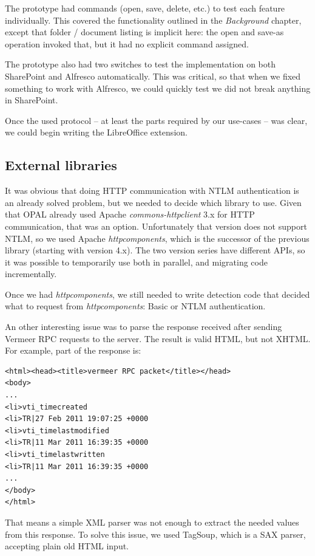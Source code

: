 The prototype had commands (open, save, delete, etc.) to test each feature
individually.  This covered the functionality outlined in the \emph{Background}
chapter, except that folder / document listing is implicit here: the open and
save-as operation invoked that, but it had no explicit command assigned.

The prototype also had two switches to test the implementation on both
SharePoint and Alfresco automatically. This was critical, so that when we fixed
something to work with Alfresco, we could quickly test we did not break
anything in SharePoint.

Once the used protocol -- at least the parts required by our use-cases -- was
clear, we could begin writing the LibreOffice extension.

\subsection{External libraries}

It was obvious that doing HTTP communication with NTLM authentication is an
already solved problem, but we needed to decide which library to use. Given that
OPAL already used Apache \emph{commons-httpclient}\cite{httpclient} 3.x for
HTTP communication, that was an option. Unfortunately that version does not support NTLM, so we used
Apache \emph{httpcomponents}\cite{httpcomponents}, which is the successor of
the previous library (starting with version 4.x). The two version series have
different APIs, so it was possible to temporarily use both in parallel, and migrating code
incrementally.

Once we had \emph{httpcomponents}, we still needed to write detection code that
decided what to request from \emph{httpcomponents}: Basic or NTLM
authentication.

An other interesting issue was to parse the response received after sending
Vermeer RPC requests to the server. The result is valid HTML, but not XHTML.
For example, part of the response is:

\begin{lstlisting}
<html><head><title>vermeer RPC packet</title></head>
<body>
...
<li>vti_timecreated
<li>TR|27 Feb 2011 19:07:25 +0000
<li>vti_timelastmodified
<li>TR|11 Mar 2011 16:39:35 +0000
<li>vti_timelastwritten
<li>TR|11 Mar 2011 16:39:35 +0000
...
</body>
</html>\end{lstlisting}

That means a simple XML parser was not enough to extract the needed values from
this response. To solve this issue, we used TagSoup\cite{tagsoup}, which is a
SAX parser, accepting plain old HTML input.

